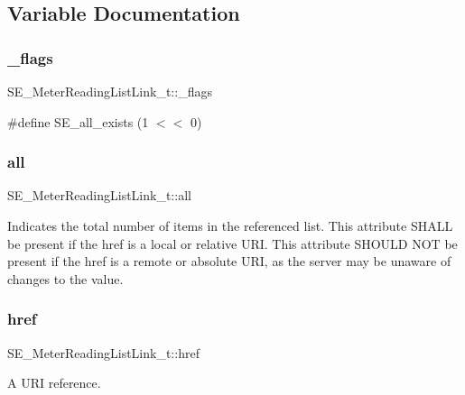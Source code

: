 \subsection{Variable Documentation}
\mbox{\label{group__MeterReadingListLink_ga1272652a9d058acde8f3dcecf383693c}} 
\subsubsection{\texorpdfstring{\+\_\+flags}{\_flags}}
{\footnotesize\ttfamily S\+E\+\_\+\+Meter\+Reading\+List\+Link\+\_\+t\+::\+\_\+flags}

\#define S\+E\+\_\+all\+\_\+exists (1 $<$$<$ 0) \mbox{\label{group__MeterReadingListLink_gaa08693c64dd99f9871b9eb4e6bf45503}} 
\subsubsection{\texorpdfstring{all}{all}}
{\footnotesize\ttfamily S\+E\+\_\+\+Meter\+Reading\+List\+Link\+\_\+t\+::all}

Indicates the total number of items in the referenced list. This attribute S\+H\+A\+LL be present if the href is a local or relative U\+RI. This attribute S\+H\+O\+U\+LD N\+OT be present if the href is a remote or absolute U\+RI, as the server may be unaware of changes to the value. \mbox{\label{group__MeterReadingListLink_ga319b0a4be54e74724d6291cf2c043050}} 
\subsubsection{\texorpdfstring{href}{href}}
{\footnotesize\ttfamily S\+E\+\_\+\+Meter\+Reading\+List\+Link\+\_\+t\+::href}

A U\+RI reference. 